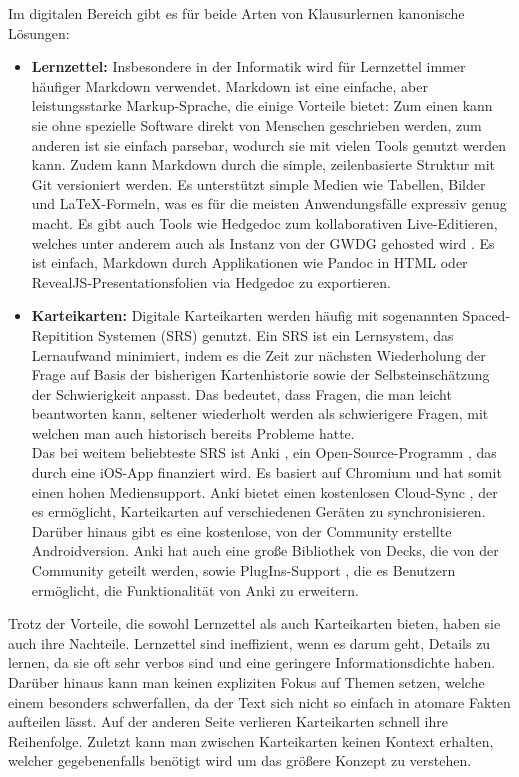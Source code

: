 \documentclass[ngerman]{article}
\begin{document}
Im digitalen Bereich gibt es für beide Arten von Klausurlernen kanonische Lösungen:
\begin{itemize}
  \item \textbf{Lernzettel:} Insbesondere in der Informatik wird für Lernzettel immer häufiger Markdown \cite{Markdown} verwendet. Markdown ist eine einfache, aber leistungsstarke Markup-Sprache, die einige Vorteile bietet: Zum einen kann sie ohne spezielle Software direkt von Menschen geschrieben werden, zum anderen ist sie einfach parsebar, wodurch sie mit vielen Tools genutzt werden kann. Zudem kann Markdown durch die simple, zeilenbasierte Struktur mit Git versioniert werden. Es unterstützt simple Medien wie Tabellen, Bilder und \LaTeX-Formeln, was es für die meisten Anwendungsfälle expressiv genug macht. Es gibt auch Tools wie Hedgedoc \cite{HedgeDoc} zum kollaborativen Live-Editieren, welches unter anderem auch als Instanz von der GWDG gehosted wird \cite{HedgeDocGWDG}. Es ist einfach, Markdown durch Applikationen wie Pandoc \cite{Pandoc} in HTML oder RevealJS-Presentationsfolien \cite{RevealJS} via Hedgedoc zu exportieren.
  \item \textbf{Karteikarten:} Digitale Karteikarten werden häufig mit sogenannten Spaced-Repitition Systemen (SRS) genutzt. Ein SRS ist ein Lernsystem, das Lernaufwand minimiert, indem es die Zeit zur nächsten Wiederholung der Frage auf Basis der bisherigen Kartenhistorie sowie der Selbsteinschätzung der Schwierigkeit anpasst. Das bedeutet, dass Fragen, die man leicht beantworten kann, seltener wiederholt werden als schwierigere Fragen, mit welchen man auch historisch bereits Probleme hatte.\\
    Das bei weitem beliebteste SRS ist Anki \cite{Anki}, ein Open-Source-Programm \cite{AnkiGithub}, das durch eine iOS-App \cite{AnkiiOS} finanziert wird. Es basiert auf Chromium \cite{QTWebEngine} und hat somit einen hohen Mediensupport. Anki bietet einen kostenlosen Cloud-Sync \cite{AnkiCloud}, der es ermöglicht, Karteikarten auf verschiedenen Geräten zu synchronisieren. Darüber hinaus gibt es eine kostenlose, von der Community erstellte Androidversion. Anki hat auch eine große Bibliothek von Decks, die von der Community geteilt werden, sowie PlugIns-Support \cite{AnkiPlugins}, die es Benutzern ermöglicht, die Funktionalität von Anki zu erweitern.
\end{itemize}

Trotz der Vorteile, die sowohl Lernzettel als auch Karteikarten bieten, haben sie auch ihre Nachteile. Lernzettel sind ineffizient, wenn es darum geht, Details zu lernen, da sie oft sehr verbos sind und eine geringere Informationsdichte haben. Darüber hinaus kann man keinen expliziten Fokus auf Themen setzen, welche einem besonders schwerfallen, da der Text sich nicht so einfach in atomare Fakten aufteilen lässt. Auf der anderen Seite verlieren Karteikarten schnell ihre Reihenfolge. Zuletzt kann man zwischen Karteikarten keinen Kontext erhalten, welcher gegebenenfalls benötigt wird um das größere Konzept zu verstehen.
\end{document}
